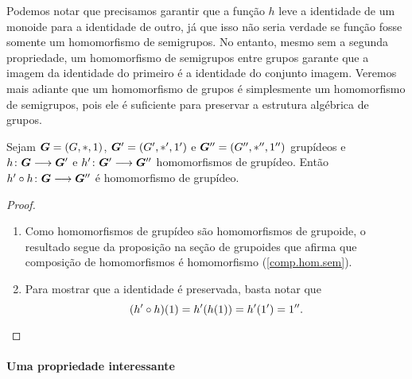 Podemos notar que precisamos garantir que a função $h$ leve a identidade de um monoide para a identidade de outro, já que isso não seria verdade se função fosse somente um homomorfismo de semigrupos. No entanto, mesmo sem a segunda propriedade, um homomorfismo de semigrupos entre grupos garante que a imagem da identidade do primeiro é a identidade do conjunto imagem. Veremos mais adiante que um homomorfismo de grupos é simplesmente um homomorfismo de semigrupos, pois ele é suficiente para preservar a estrutura algébrica de grupos.

\begin{proposition}
\label{comp.hom.grupideo}
Sejam $\bm G=(G,\ast,1)$, $\bm G'=(G',\ast',1')$ e $\bm G''=(G'',\ast'',1'')$ grupídeos e ${h}\colon {\bm G} \longrightarrow {\bm G'}$ e ${h'}\colon {\bm G'} \longrightarrow {\bm G''}$ homomorfismos de grupídeo. Então ${h' \circ h}\colon {\bm G} \longrightarrow {\bm G''}$ é homomorfismo de grupídeo.
\end{proposition}
\begin{proof}
	\begin{enumerate}
	\item Como homomorfismos de grupídeo são homomorfismos de grupoide, o resultado segue da proposição na seção de grupoides que afirma que composição de homomorfismos é homomorfismo (\ref{comp.hom.sem}).
	\item Para mostrar que a identidade é preservada, basta notar que
		\begin{equation*}
		(h' \circ h)(1) = h'(h(1)) = h'(1') = 1''.
		\qedhere
		\end{equation*}
	\end{enumerate}
\end{proof}

\paragraph{Uma propriedade interessante}

